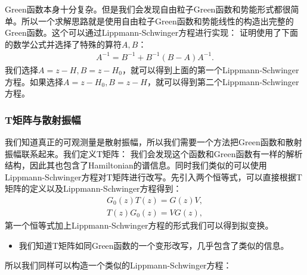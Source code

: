 \bigskip
{}

Green函数本身十分复杂。但是我们会发现自由粒子Green函数和势能形式都很简单。所以一个求解思路就是使用自由粒子Green函数和势能线性的构造出完整的Green函数。这个可以通过Lippmann-Schwinger方程进行实现：
证明使用了下面的数学公式并选择了特殊的算符$ A,B $：
\begin{align}
  A^{-1}=B^{-1}+B^{-1}(B-A)A^{-1}.
\end{align}
我们选择$ A=z-H, B=z-H_0 $，就可以得到上面的第一个Lippmann-Schwinger方程。如果选择$ A
=z-H_0, B=z-H $，就可以得到第二个Lippmann-Schwinger方程。

\subsubsection{T矩阵与散射振幅}

\bigskip
{}

我们知道真正的可观测量是散射振幅，所以我们需要一个方法把Green函数和散射振幅联系起来。我们定义T矩阵：
我们会发现这个函数和Green函数有一样的解析结构，因此其也包含了Hamiltonian的谱信息。同时我们类似的可以使用Lippmann-Schwinger方程对T矩阵进行改写。先引入两个恒等式，可以直接根据T矩阵的定义以及Lippmann-Schwinger方程得到：
\begin{align}\label{eq:T_matrix_identities}
  G_0(z)T(z)=G(z)V,\\
  T(z)G_0(z)=VG(z),
\end{align}
第一个恒等式加上Lippmann-Schwinger方程的形式我们可以得到拟变换。
\begin{itemize}
  \item 我们知道T矩阵如同Green函数的一个变形改写，几乎包含了类似的信息。
\end{itemize}
所以我们同样可以构造一个类似的Lippmann-Schwinger方程：

